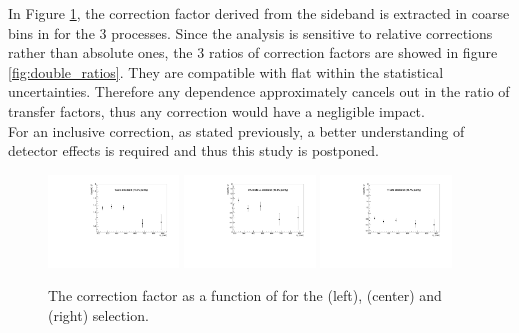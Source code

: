 In Figure \ref{fig:sfVsHt}, the correction factor derived from the \mhtmet sideband is extracted in coarse bins in \scalht for the 3 processes. 
Since the analysis is sensitive to relative corrections rather than absolute ones, the 3 ratios of correction factors 
are showed in figure \ref{fig:double_ratios}. They are compatible with flat within the statistical uncertainties. 
Therefore any \scalht dependence approximately cancels out in the ratio of transfer factors, thus any correction would have a negligible impact. \\
For an inclusive correction, as stated previously, a better understanding of detector effects is required and thus this study is postponed. 

\begin{figure}[!h]
  \centering
  \includegraphics[width=0.31\textwidth]{figures/sidebandCorr/SFvsHT_MHTOverMET_WJets}
  \includegraphics[width=0.31\textwidth]{figures/sidebandCorr/SFvsHT_MHTOverMET_DYJetsToLL}
  \includegraphics[width=0.31\textwidth]{figures/sidebandCorr/SFvsHT_MHTOverMET_TTJets}
  \caption{The correction factor as a function of \scalht for the \wj (left), \zj (center) and \ttj (right) selection.}
  \label{fig:sfVsHt}
\end{figure}

